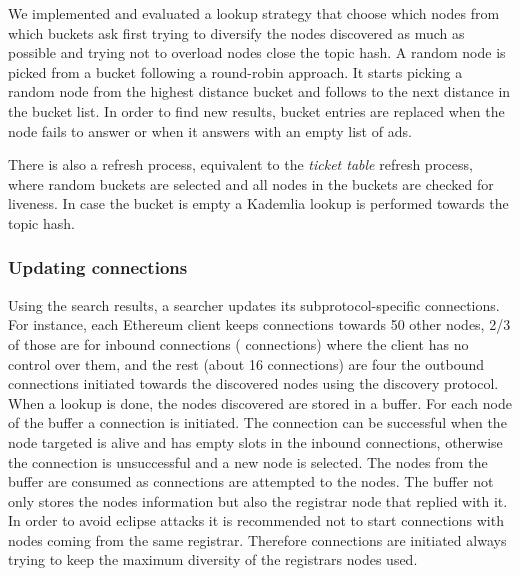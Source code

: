 We implemented and evaluated a lookup strategy that choose which nodes from which buckets ask first trying to diversify the nodes discovered as much as possible and trying not to overload nodes close the topic hash.
A random node is picked from a bucket following a round-robin approach. 
It starts picking a random node from the highest distance bucket and follows to the next distance in the bucket list.
In order to find new results,  bucket entries are replaced when the node fails to answer or when it answers with an empty list of ads. 

There is also a refresh process,  equivalent to the \emph{ticket table} refresh process, where random buckets are selected and all nodes in the buckets are checked for liveness.
In case the bucket is empty a Kademlia lookup is performed towards the topic hash.

\subsubsection{Updating connections}

Using the search results, a searcher updates its subprotocol-specific connections. 
For instance,  each Ethereum client keeps connections towards 50 other nodes,  2/3 of those are for inbound connections ( connections) where the client has no control over them, and the rest (about 16 connections) are four the outbound connections initiated towards the discovered nodes using the discovery protocol. 
When a lookup is done,  the nodes discovered are stored in a buffer. 
For each node of the buffer a connection is initiated. 
The connection can be successful when the node targeted is alive and has empty slots in the inbound connections,  otherwise the connection is unsuccessful and a new node is selected.
The nodes from the buffer are consumed as connections are attempted to the nodes.
The buffer not only stores the nodes information but also the registrar node that replied with it.
In order to avoid eclipse attacks it is recommended not to start connections with nodes coming from the same registrar. 
Therefore connections are initiated always trying to keep the maximum diversity of the  registrars nodes used.



